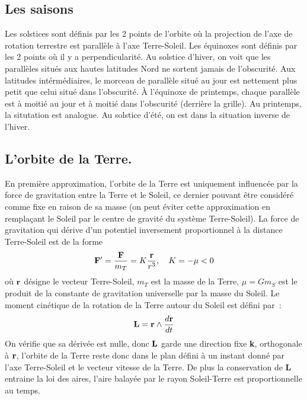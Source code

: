 \documentclass[a4paper,11pt]{article}
\begin{document}
\begin{giacjshere}
\subsection{Les saisons}
Les solstices sont définis par les 2 points de l'orbite où la projection
de l'axe de rotation terrestre est parallèle à l'axe Terre-Soleil.
Les équinoxes sont définis par les 2 points où il y a perpendicularité.
Au solstice d'hiver, on voit que les parallèles situés aux hautes latitudes
Nord ne sortent jamais de l'obscurité. Aux latitudes intérmédiaires,
le morceau de parallèle situé au jour est nettement plus petit que
celui situé dans l'obscurité.
\`A l'équinoxe de printemps, chaque parallèle est à moitié au jour
et à moitié dans l'obscurité (derrière la grille). Au printemps,
la situtation est analogue.
Au solstice d'été, on est dans la situation inverse de l'hiver.

\pagebreak

\subsection{L'orbite de la Terre.}
En première approximation, l'orbite de la Terre est uniquement
influencée par la force de gravitation entre la Terre et le Soleil,
ce dernier pouvant être considéré comme fixe en raison de sa masse
(on peut éviter cette approximation en remplaçant le Soleil par
le centre de gravité du système Terre-Soleil).
La force de gravitation qui dérive d'un potentiel inversement
proportionnel à la distance Terre-Soleil est de la forme
\[ {\bf F'}=\frac{{\bf F}}{m_T}= K \frac{\bf r}{r^3}, \quad K=-\mu<0\]
o\`u ${\bf r}$ d\'esigne le vecteur Terre-Soleil, $m_T$ est la masse
de la Terre, $\mu=Gm_S$ est le produit de la constante
de gravitation universelle par la masse du Soleil.
Le moment cinétique de la rotation de la Terre autour du Soleil
est d\'efini par~:
\[ {\bf L} = {\bf r} \wedge \frac{d \bf r}{dt} \]
On v\'erifie que sa d\'eriv\'ee est nulle, donc ${\bf L}$ garde
une direction fixe {\bf k}, orthogonale \`a ${\bf r}$,
l'orbite de la Terre reste donc dans le plan défini \`a un instant
donn\'e par l'axe Terre-Soleil et le vecteur vitesse de la Terre.
De plus la conservation de {\bf L} entraine 
la loi des aires, l'aire balayée par le rayon Soleil-Terre
est proportionnelle au temps.


\end{giacjshere}
\end{document}
